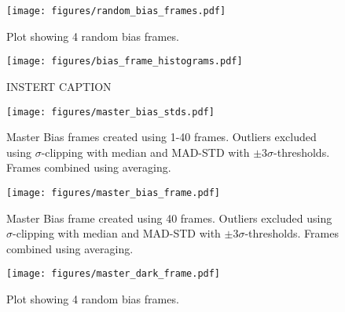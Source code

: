 \documentclass{aastex631}
\begin{document}
\begin{figure}[ht!]
    \begin{centering}
        \texttt{[image: figures/random\_bias\_frames.pdf]}
        \caption{
            Plot showing 4 random bias frames.
        }
        \label{fig:random_bias}
    \end{centering}
\end{figure}

\begin{figure}[ht!]
    \begin{centering}
        \texttt{[image: figures/bias\_frame\_histograms.pdf]}
        \caption{
            INSTERT CAPTION
        }
        \label{fig:bias_frame_histograms}
    \end{centering}
\end{figure}

\begin{figure}[ht!]
    \begin{centering}
        \texttt{[image: figures/master\_bias\_stds.pdf]}
        \caption{
            Master Bias frames created using 1-40 frames. Outliers excluded using $\sigma$-clipping with median and MAD-STD with $\pm3\sigma$-thresholds. Frames combined using averaging.
        }
        \label{fig:bias_frame_stats}
    \end{centering}
\end{figure}

\begin{figure}[ht!]
    \begin{centering}
        \texttt{[image: figures/master\_bias\_frame.pdf]}
        \caption{
            Master Bias frame created using 40 frames. Outliers excluded using $\sigma$-clipping with median and MAD-STD with $\pm3\sigma$-thresholds. Frames combined using averaging.
        }
        \label{fig:master_bias}
    \end{centering}
\end{figure}

\begin{figure}[ht!]
    \begin{centering}
        \texttt{[image: figures/master\_dark\_frame.pdf]}
        \caption{
            Plot showing 4 random bias frames.
        }
        \label{fig:master_dark}
    \end{centering}
\end{figure}
\end{document}
